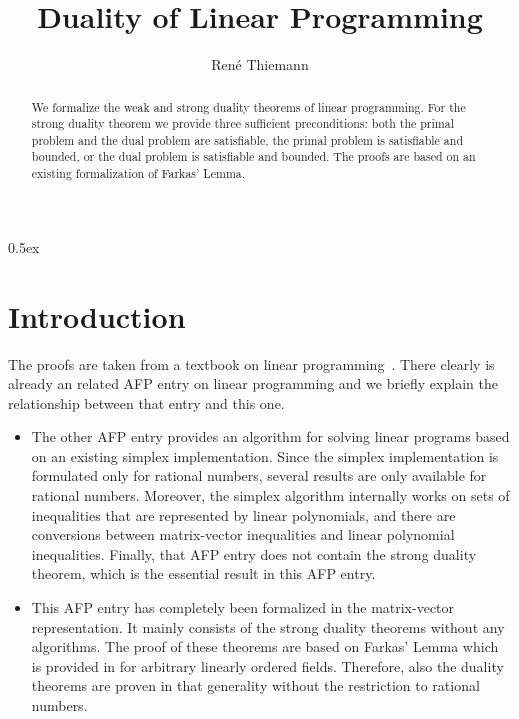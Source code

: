 \documentclass[11pt,a4paper]{article}
\begin{document}
\title{Duality of Linear Programming}
\author{René Thiemann}

\maketitle

\begin{abstract}
We formalize the weak and strong duality theorems of linear programming.
For the strong duality theorem we provide three sufficient 
preconditions: both the primal problem and the dual problem are satisfiable, 
the primal problem is satisfiable and bounded, or the dual problem
is satisfiable and bounded. The proofs are based on an existing formalization
of Farkas' Lemma.
\end{abstract}

\tableofcontents

\parindent 0pt\parskip 0.5ex

\section{Introduction}
The proofs are taken from a textbook on linear programming~\cite{schrijver1998theory}.
There clearly is already an related AFP entry on linear programming 
\cite{Linear_Programming-AFP} and we briefly explain the relationship
between that entry and this one.
\begin{itemize}
\item The other AFP entry provides an algorithm for solving linear programs based
on an existing simplex implementation. Since the simplex implementation is
formulated only for rational numbers, several results are only available for
rational numbers. Moreover, the simplex algorithm internally works on sets
of inequalities that are represented by linear polynomials, and there are 
conversions between matrix-vector inequalities and linear polynomial inequalities. 
Finally, that AFP entry does not contain the strong duality theorem,
which is the essential result in this AFP entry.
\item This AFP entry has completely been formalized 
  in the matrix-vector representation. It mainly consists of
  the strong duality theorems without any algorithms.
  The proof of these theorems are based on Farkas' Lemma which 
  is provided in \cite{Linear_Inequalities-AFP} for arbitrary linearly ordered fields. Therefore, also the duality theorems are 
proven in that generality without the restriction to rational numbers. 
\end{itemize}





\end{document}
